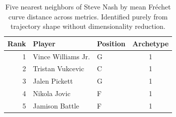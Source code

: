 \begin{table}[htbp]
  \centering\small
  \begin{tabular}{rllc}
    \toprule
    Rank & Player & Position & Archetype \\
    \midrule
    1 & Vince Williams Jr. & G & 1 \\
    2 & Tristan Vukcevic & C & 1 \\
    3 & Jalen Pickett & G & 1 \\
    4 & Nikola Jovic & F & 1 \\
    5 & Jamison Battle & F & 1 \\
    \bottomrule
  \end{tabular}
  \caption{Five nearest neighbors of Steve Nash by mean Fr\'{e}chet curve distance across metrics. Identified purely from trajectory shape without dimensionality reduction.}
  \label{tab:Steve_Nash_frechet_curve_neighbors}
\end{table}

